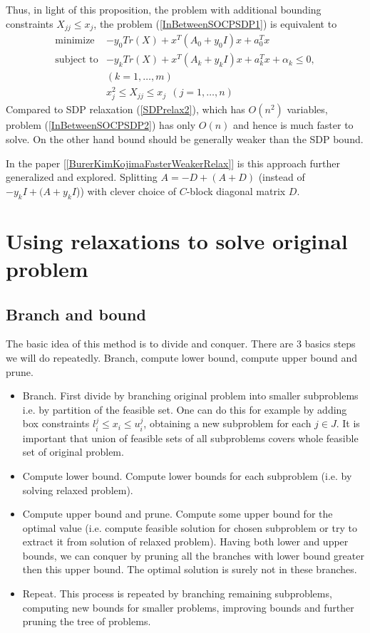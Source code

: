 \documentclass[10pt,oneside]{book}
\theoremstyle{definition}
\begin{document}
Thus, in light of this proposition, the problem with additional bounding constraints $X_{jj}\leq x_j$, the problem (\ref{InBetweenSOCPSDP1}) is equivalent to 
\begin{equation}
\label{InBetweenSOCPSDP2}
\begin{array}{ll}
\mbox{minimize}& -y_0 Tr(X) +  x^T(A_0+y_0 I)x + a_0^Tx \\
\mbox{subject to}& -y_k Tr(X) +  x^T(A_k+y_kI)x + a_k^Tx + \alpha_k \leq 0, \\ &(k = 1,\dots ,m) \\
& x_j^2\leq X_{jj} \leq x_j \ \ (j = 1,\dots ,n)
\end{array} 
\end{equation}
Compared to SDP relaxation (\ref{SDPrelax2}), which has $O(n^2)$ variables, problem (\ref{InBetweenSOCPSDP2}) has only $O(n)$ and hence is much faster to solve. On the other hand bound should be generally weaker than the SDP bound.

In the paper [\ref{BurerKimKojimaFasterWeakerRelax}] is this approach further generalized and explored. Splitting $A= -D + (A+D)$ (instead of $-y_kI + (A +y_kI$)) with clever choice of $C$-block diagonal matrix $D$. 


\section{Using relaxations to solve original problem }

\subsection{Branch and bound}

The basic idea of this method is to divide and conquer.
There are 3 basics steps we will do repeatedly. Branch, compute lower bound, compute upper bound and prune.
\begin{itemize}
\item Branch. First divide by branching original problem into smaller subproblems i.e. by partition of the feasible set. One can do this for example by adding box constraints $l^j_i\leq x_i \leq u^j_i$, obtaining a new subproblem for each $j\in J$.  It is important that union of feasible sets of all subproblems covers whole feasible set of original problem.
\item Compute lower bound. Compute lower bounds for each subproblem (i.e. by solving relaxed problem). 
\item Compute upper bound and prune. Compute some upper bound for the optimal value (i.e. compute feasible solution for chosen subproblem or try to extract it from solution of relaxed problem). Having both lower and upper bounds, we can conquer by pruning all the branches with lower bound greater then this upper bound. The optimal solution is surely not in these branches.
\item Repeat. This process is repeated by branching remaining subproblems, computing new bounds for smaller problems, improving bounds and further pruning the tree of problems.
\end{itemize}
\end{document}
